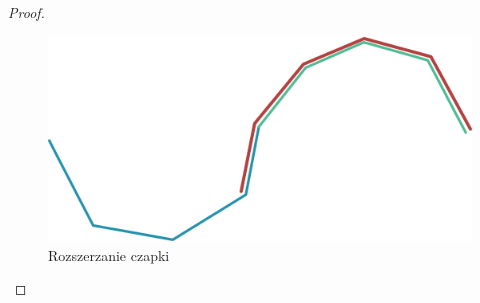 \begin{proof}
	\begin{figure}[H]
		\centering
		\includegraphics{images/k-czapka.png}
		\caption{Rozszerzanie czapki}
	\end{figure}

\end{proof}